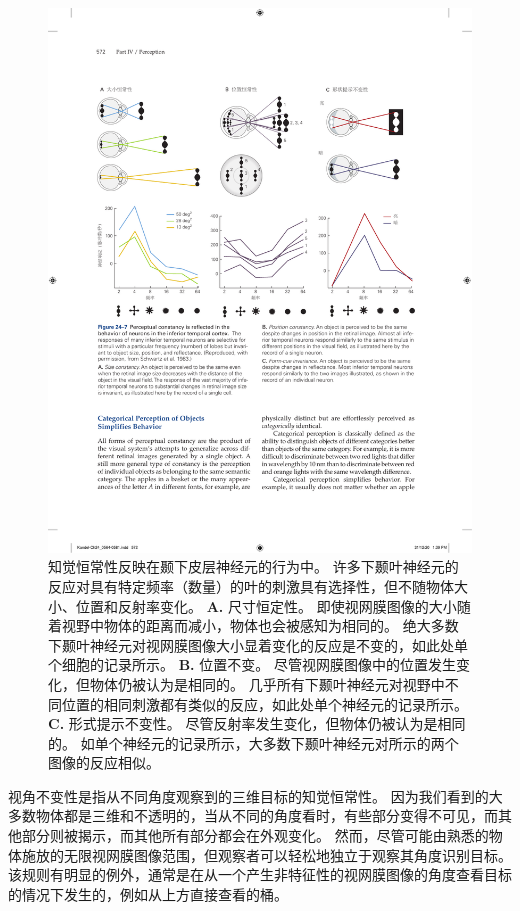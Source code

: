 \begin{figure}[htbp]
	\centering
	\includegraphics[width=1.0\linewidth]{chap24/fig_24_7}
	\caption{知觉恒常性反映在颞下皮层神经元的行为中。
		许多下颞叶神经元的反应对具有特定频率（数量）的叶的刺激具有选择性，但不随物体大小、位置和反射率变化。
		\textbf{A.} 尺寸恒定性。
		即使视网膜图像的大小随着视野中物体的距离而减小，物体也会被感知为相同的。
		绝大多数下颞叶神经元对视网膜图像大小显着变化的反应是不变的，如此处单个细胞的记录所示。
		\textbf{B.} 位置不变。
		尽管视网膜图像中的位置发生变化，但物体仍被认为是相同的。
		几乎所有下颞叶神经元对视野中不同位置的相同刺激都有类似的反应，如此处单个神经元的记录所示。
		\textbf{C.} 形式提示不变性。
		尽管反射率发生变化，但物体仍被认为是相同的。
		如单个神经元的记录所示，大多数下颞叶神经元对所示的两个图像的反应相似。}
	\label{fig:24_7}
\end{figure}


视角不变性是指从不同角度观察到的三维目标的知觉恒常性。
因为我们看到的大多数物体都是三维和不透明的，当从不同的角度看时，有些部分变得不可见，而其他部分则被揭示，而其他所有部分都会在外观变化。
然而，尽管可能由熟悉的物体施放的无限视网膜图像范围，但观察者可以轻松地独立于观察其角度识别目标。
该规则有明显的例外，通常是在从一个产生非特征性的视网膜图像的角度查看目标的情况下发生的，例如从上方直接查看的桶。


